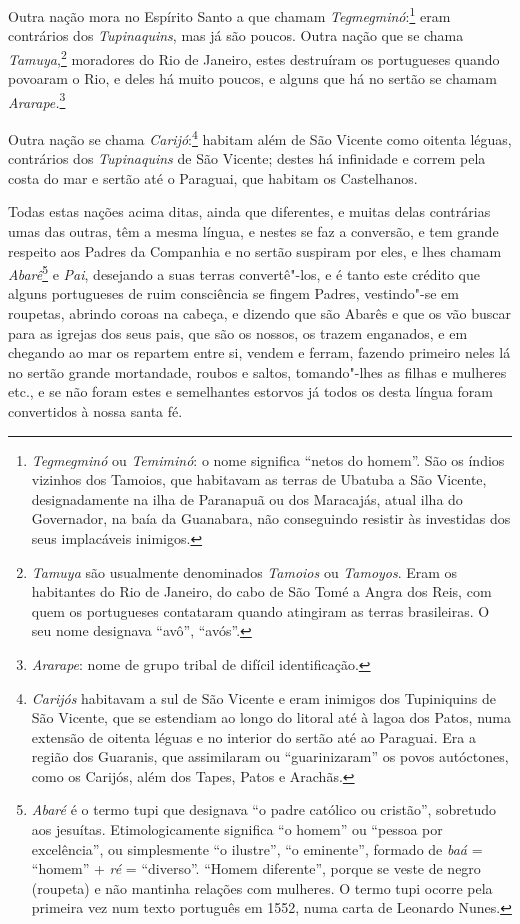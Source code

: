 \begin{linenumbers}
 Outra nação mora no Espírito Santo a que chamam 
\textit{Tegmegminó}:\footnote{ \textit{Tegmegminó} ou \textit{Temiminó}: o nome significa
``netos do homem''. São os índios vizinhos dos Tamoios, que habitavam as
terras de Ubatuba a São Vicente, designadamente na ilha de Paranapuã ou
dos Maracajás, atual ilha do Governador, na baía da Guanabara, não
conseguindo resistir às investidas dos seus implacáveis
inimigos.} eram contrários dos \textit{Tupinaquins}, mas já
são poucos. Outra nação que se chama \textit{Tamuya},\footnote{ \textit{Tamuya} são usualmente denominados \textit{Tamoios} ou
\textit{Tamoyos}. Eram os habitantes do Rio de Janeiro, do cabo de São
Tomé a Angra dos Reis, com quem os portugueses contataram quando
atingiram as terras brasileiras. O seu nome designava ``avô'', ``avós''.}
moradores do Rio de Janeiro, estes destruíram os portugueses
quando povoaram o Rio, e deles há muito poucos, e alguns que há no
sertão se chamam \textit{Ararape.}\footnote{ \textit{Ararape}: nome
de grupo tribal de difícil identificação.} 

 Outra nação se chama \textit{Carijó}:\footnote{ \textit{Carijós} 
habitavam a sul de São Vicente e eram inimigos dos Tupiniquins de São
Vicente, que se estendiam ao longo do litoral até à lagoa dos Patos,
numa extensão de oitenta léguas e no interior do sertão até ao
Paraguai. Era a região dos Guaranis, que assimilaram ou ``guarinizaram''
os povos autóctones, como os Carijós, além dos Tapes, Patos e Arachãs.} 
habitam além de São Vicente como oitenta léguas, contrários dos
\textit{Tupinaquins} de São Vicente; destes há infinidade e correm pela
costa do mar e sertão até o Paraguai, que habitam os Castelhanos. 

 Todas estas nações acima ditas, ainda que diferentes, e muitas delas
contrárias umas das outras, têm a mesma língua, e nestes se faz a
conversão, e tem grande respeito aos Padres da Companhia e no sertão
suspiram por eles, e lhes chamam \textit{Abarê}\footnote{ \textit{Abaré} 
é o termo tupi que designava ``o padre católico ou
cristão'', sobretudo aos jesuítas. Etimologicamente significa ``o homem''
ou ``pessoa por excelência'', ou simplesmente ``o ilustre'', ``o eminente'',
formado de \textit{baá} = ``homem'' + \textit{ré} = ``diverso''. ``Homem
diferente'', porque se veste de negro (roupeta) e não mantinha relações
com mulheres. O termo tupi ocorre pela primeira vez num texto português
em 1552, numa carta de Leonardo Nunes.} e\textit{
Pai}, desejando a suas terras convertê"-los, e é tanto este crédito que
alguns portugueses de ruim consciência se fingem Padres, vestindo"-se em
roupetas, abrindo coroas na cabeça, e dizendo que são Abarês e que os
vão buscar para as igrejas dos seus pais, que são os nossos, os trazem
enganados, e em chegando ao mar os repartem entre si, vendem e ferram,
fazendo primeiro neles lá no sertão grande mortandade, roubos e saltos,
tomando"-lhes as filhas e mulheres etc., e se não foram estes e
semelhantes estorvos já todos os desta língua foram convertidos à nossa santa fé.


\end{linenumbers}
